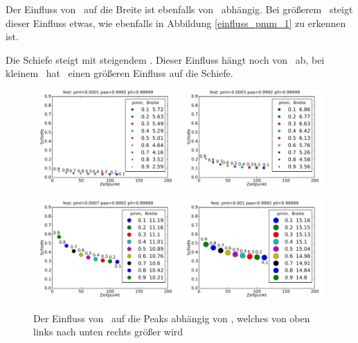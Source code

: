 Der Einfluss von \pmm\ auf die Breite ist ebenfalls von \paa\ abhängig. Bei größerem \paa\ steigt dieser Einfluss etwas, wie ebenfalls in Abbildung \ref{einfluss_pmm_1} zu erkennen ist.


Die Schiefe steigt mit steigendem \pmm. Dieser Einfluss hängt noch von \paa\ ab, bei kleinem \paa\ hat \pmm\ einen größeren Einfluss auf die Schiefe.


\begin{figure}[h]
\includegraphics[width=0.49\textwidth]{bilder/pmm/3fest_p_00001_09992_099999}
\includegraphics[width=0.49\textwidth]{bilder/pmm/3fest_p_00003_09992_099999}

\vspace*{5pt}

\includegraphics[width=0.49\textwidth]{bilder/pmm/3fest_p_00007_09992_099999}
\includegraphics[width=0.49\textwidth]{bilder/pmm/3fest_p_0001_09992_099999}
\caption[Der Einfluss von \pmm\ auf die Peaks abhängig von \pml]{Der Einfluss von \pmm\ auf die Peaks abhängig von \pml, welches von oben links nach unten rechts größer wird}
\label{einfluss_pmm_2}
\end{figure}

